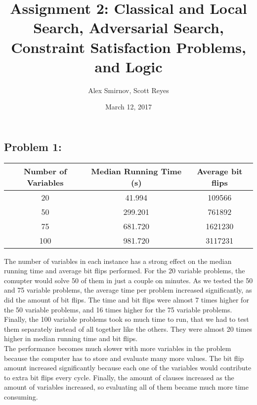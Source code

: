 \documentclass[11pt, oneside]{article}   	%
\title{Assignment 2: Classical and Local Search, Adversarial Search, Constraint Satisfaction Problems, and Logic}
\author{Alex Smirnov, Scott Reyes}
\date{March 12, 2017}							%
\begin{document}
\maketitle
\begin{flushleft}

\section*{Problem 1:}
\begin{center}
\begin{tabular}{ |c|c|c|} 
\hline
Number of Variables & Median Running Time (s) & Average bit flips \\\hline
20 & 41.994 & 109566 \\\hline
50 & 299.201 & 761892 \\\hline
75 & 681.720 & 1621230 \\\hline
100 & 981.720 & 3117231 \\
\hline
\end{tabular}
\end{center}

The number of variables in each instance has a strong effect on the median running time and average bit flips performed. For the 20 variable problems, the comupter would solve 50 of them in just a couple on minutes. As we tested the 50 and 75 variable problems, the average time per problem increased significantly, as did the amount of bit flips. The time and bit flips were almost 7 times higher for the 50 variable problems, and 16 times higher for the 75 variable problems. Finally, the 100 variable problems took so much time to run, that we had to test them separately instead of all together like the others. They were almost 20 times higher in median running time and bit flips. \\\medskip
The performance becomes much slower with more variables in the problem because the computer has to store and evaluate many more values. The bit flip amount increased significantly because each one of the variables would contribute to extra bit flips every cycle. Finally, the amount of clauses increased as the amount of variables increased, so evaluating all of them became much more time consuming.\\\medskip


\end{flushleft}
\end{document}
